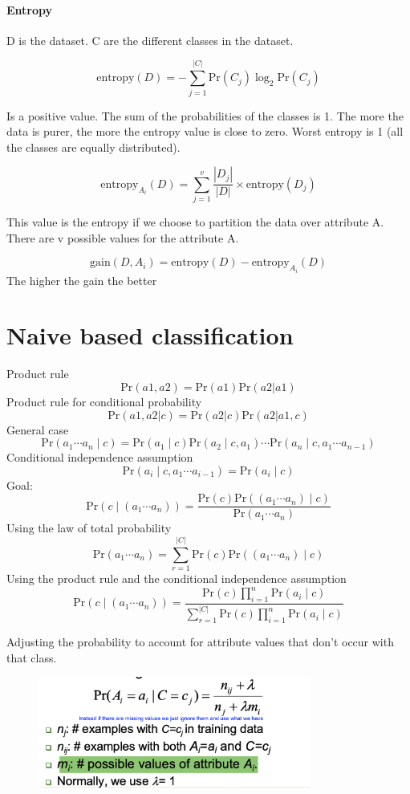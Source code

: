 \documentclass[10pt,oneside,a4paper]{article}
\begin{document}
\paragraph{Entropy}
D is the dataset. C are the different classes in the dataset.

\[
    \text{entropy}(D) = - \sum_{j=1}^{|C|} \text{Pr}(C_j) \log_2 \text{Pr}(C_j)
\]

Is a positive value.
The sum of the probabilities of the classes is 1.
The more the data is purer, the more the entropy value is close to zero.
Worst entropy is 1 (all the classes are equally distributed).

\[
    \text{entropy}_{A_i}(D) = \sum_{j=1}^{v} \frac{|D_j|}{|D|} \times \text{entropy}(D_j)
\]

This value is the entropy if we choose to partition the data over attribute A. There are v possible values for the attribute A.

\[
    \text{gain}(D, A_i) = \text{entropy}(D) - \text{entropy}_{A_i}(D)
\]
The higher the gain the better

\section{Naive based classification}
Product rule
\[
    \text{Pr}(a1, a2) = \text{Pr}(a1) \text{Pr}(a2 | a1)
\]
Product rule for conditional probability
\[
    \text{Pr}(a1, a2|c) = \text{Pr}(a2|c) \text{Pr}(a2 | a1, c)
\]
General case
\[
    \text{Pr}(a_1 \cdots a_n \mid c) = \text{Pr}(a_1 \mid c) \text{Pr}(a_2 \mid c, a_1) \cdots \text{Pr}(a_n \mid c, a_1 \cdots a_{n-1})
\]
Conditional independence assumption
\[
    \text{Pr}(a_i \mid c, a_1 \cdots a_{i-1}) = \text{Pr}(a_i \mid c)
\]
Goal:
\[
    \text{Pr}(c \mid (a_1 \cdots a_n)) = \frac{\text{Pr}(c)  \text{Pr}((a_1 \cdots a_n) \mid c)}{\text{Pr}(a_1 \cdots a_n)}
\]
Using the law of total probability
\[
    \text{Pr}(a_1 \cdots a_n) = \sum_{r=1}^{|C|} \text{Pr}(c) \text{Pr}((a_1  \cdots a_n) \mid c)
\]
Using the product rule and the conditional independence assumption
\[
    \text{Pr}(c \mid (a_1 \cdots a_n)) = \frac{\text{Pr}(c) \prod_{i=1}^{n} \text{Pr}(a_i \mid c)}{\sum_{r=1}^{|C|} \text{Pr}(c) \prod_{i=1}^{n} \text{Pr}(a_i \mid c)}
\]

Adjusting the probability to account for attribute values that don't occur with that class.
\begin{figure}[H]
    \centering
    \includegraphics[width=0.8\textwidth]{Images/Zerocounts.png}
\end{figure}
\end{document}
